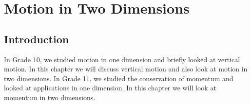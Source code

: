 \chapter{Motion in Two Dimensions}
\label{p:m:m2d12}

\section{Introduction}
In Grade 10, we studied motion in one dimension and briefly looked at vertical motion. In this chapter we will discuss vertical motion and also look at motion in two dimensions. In Grade 11, we studied the conservation of momentum and looked at applications in one dimension. In this chapter we will look at momentum in two dimensions.


